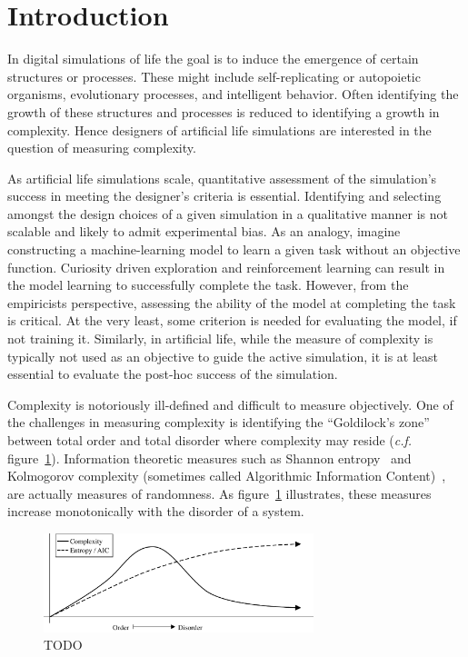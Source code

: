 \section{Introduction}
\label{sec:intro}

In digital simulations of life the goal is to induce the emergence of certain
structures or processes. These might include self-replicating or autopoietic
organisms, evolutionary processes, and intelligent behavior. Often identifying
the growth of these structures and processes is reduced to identifying a growth
in complexity. Hence designers of artificial life simulations are interested in
the question of measuring complexity.

As artificial life simulations scale, quantitative assessment of the
simulation's success in meeting the designer's criteria is essential.
Identifying and selecting amongst the design choices of a given simulation in a
qualitative manner is not scalable and likely to admit experimental bias. As an
analogy, imagine constructing a machine-learning model to learn a given task
without an objective function. Curiosity driven exploration and reinforcement
learning can result in the model learning to successfully complete the task.
However, from the empiricists perspective, assessing the ability of the model
at completing the task is critical. At the very least, some criterion is needed
for evaluating the model, if not training it. Similarly, in artificial life,
while the measure of complexity is typically not used as an objective to guide
the active simulation, it is at least essential to evaluate the post-hoc
success of the simulation.

Complexity is notoriously ill-defined and difficult to measure objectively. One
of the challenges in measuring complexity is identifying the ``Goldilock's
zone'' between total order and total disorder where complexity may reside
(\emph{c.f.} figure~\ref{fig:complexity_and_entropy}). Information theoretic
measures such as Shannon entropy~\citep{shannon1948} and Kolmogorov complexity
(sometimes called Algorithmic Information Content)~\citep{kolmogorov1965,
solomonoff1964}, are actually measures of randomness. As
figure~\ref{fig:complexity_and_entropy} illustrates, these measures increase
monotonically with the disorder of a system.

\begin{figure}
\centering
\includegraphics[width=0.7\textwidth]{figures/complexity_and_entropy}
\caption{TODO}
\label{fig:complexity_and_entropy}
\end{figure}
